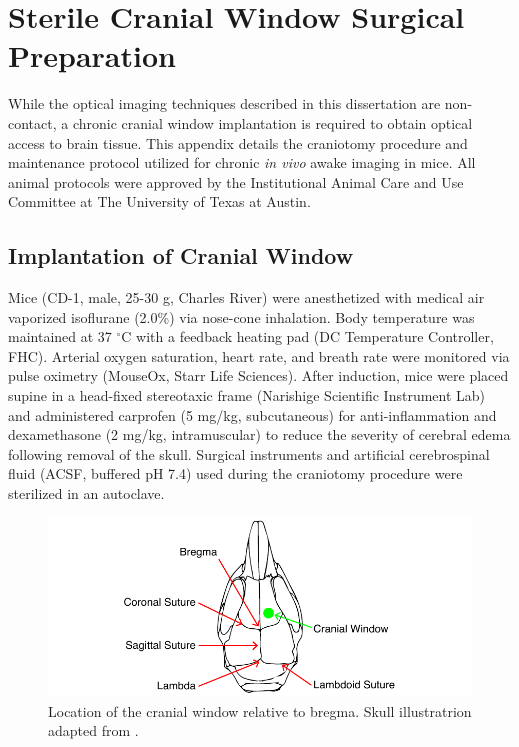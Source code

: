 
\chapter{Sterile Cranial Window Surgical Preparation} \label{app:cranial_window}

While the optical imaging techniques described in this dissertation are non-contact, a chronic cranial window implantation is required to obtain optical access to brain tissue. This appendix details the craniotomy procedure and maintenance protocol utilized for chronic \textit{in vivo} awake imaging in mice. All animal protocols were approved by the Institutional Animal Care and Use Committee at The University of Texas at Austin.


\section{Implantation of Cranial Window}

Mice (CD-1, male, 25-30 g, Charles River) were anesthetized with medical air vaporized isoflurane (2.0\%) via nose-cone inhalation. Body temperature was maintained at 37 $^\circ$C with a feedback heating pad (DC Temperature Controller, FHC). Arterial oxygen saturation, heart rate, and breath rate were monitored via pulse oximetry (MouseOx, Starr Life Sciences). After induction, mice were placed supine in a head-fixed stereotaxic frame (Narishige Scientific Instrument Lab) and administered carprofen (5 mg/kg, subcutaneous) for anti-inflammation and dexamethasone (2 mg/kg, intramuscular) to reduce the severity of cerebral edema following removal of the skull. Surgical instruments and artificial cerebrospinal fluid (ACSF, buffered pH 7.4) used during the craniotomy procedure were sterilized in an autoclave.

\begin{figure}
    \includegraphics{figures/appendix_c/cranialwindow.pdf}
    \caption[Location of the cranial window on the mouse skull]{
        \label{fig:cranialwindow}
        Location of the cranial window relative to bregma. Skull illustratrion adapted from \cite{Cook:1965wb}.
    }
\end{figure}

